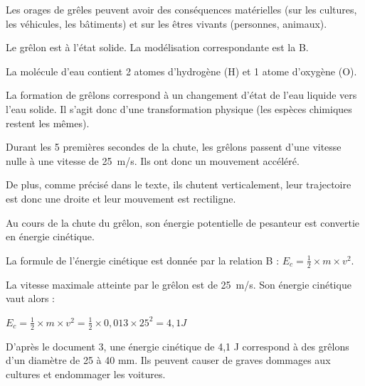 \documentclass[11pt,a4paper]{article}
\begin{document}
\pagination
\titre

\q[1 point]
Les orages de grêles peuvent avoir des conséquences matérielles (sur les cultures, les véhicules, les bâtiments) et sur les êtres vivants (personnes, animaux).

\q[0,5 point]
Le grêlon est à l'état solide. La modélisation correspondante est la B.

\q[1 point]
La molécule d'eau contient 2 atomes d'hydrogène (H) et 1 atome d'oxygène (O).

\q[1 point]
La formation de grêlons correspond à un changement d'état de l'eau liquide vers l'eau solide. Il s'agit donc d'une transformation physique (les espèces chimiques restent les mêmes).

\q[2 point]
Durant les 5 premières secondes de la chute, les grêlons passent d'une vitesse nulle à une vitesse de \SI{25}{m/s}. Ils ont donc un mouvement accéléré.

De plus, comme précisé dans le texte, ils chutent verticalement, leur trajectoire est donc une droite et leur mouvement est rectiligne.

\q[1 point]
Au cours de la chute du grêlon, son énergie potentielle de pesanteur est convertie en énergie cinétique.

\q[1 point]
La formule de l'énergie cinétique est donnée par la relation B : $E_c = \frac{1}{2} \times m \times v^2$.

\q[2,5 points]
La vitesse maximale atteinte par le grêlon est de \SI{25}{m/s}. Son énergie cinétique vaut alors :

$E_c = \frac{1}{2} \times m \times v^2 = \frac{1}{2} \times 0,013 \times 25^2 = 4,1 J $

D'après le document 3, une énergie cinétique de 4,1 J correspond à des grêlons d'un diamètre de 25 à 40 mm. Ils peuvent causer de graves dommages aux cultures et endommager les voitures.
\end{document}
